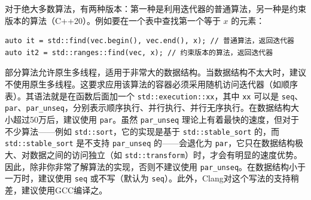 对于绝大多数算法，有两种版本：第一种是利用迭代器的普通算法，另一种是约束版本的算法（C++20）。例如要在一个表中查找第一个等于 $x$ 的元素：
\begin{verbatim}
auto it = std::find(vec.begin(), vec.end(), x); // 普通算法，返回迭代器
auto it2 = std::ranges::find(vec, x); // 约束版本的算法，返回迭代器
\end{verbatim}

部分算法允许原生多线程，适用于非常大的数据结构。当数据结构不太大时，建议不使用原生多线程。这要求应用该算法的容器必须采用随机访问迭代器（如顺序表）。其语法就是在函数后面加一个 \verb|std::execution::xx|，其中 \verb|xx| 可以是 \verb|seq|、\verb|par|、\verb|par_unseq|，分别表示顺序执行、并行执行、并行无序执行。在数据结构大小超过50万后，建议使用 \verb|par|。虽然 \verb|par_unseq| 理论上有着最快的速度，但对于不少算法——例如 \verb|std::sort|，它的实现是基于 \verb|std::stable_sort| 的，而 \verb|std::stable_sort| 是不支持 \verb|par_unseq| 的——会退化为 \verb|par|，它只在数据结构极大、对数据之间的访问独立（如 \verb|std::transform|）时，才会有明显的速度优势。因此，除非你非常了解算法的实现，否则不建议使用 \verb|par_unseq|。在数据结构小于一万时，建议使用 \verb|seq| 或不写（默认为 \verb|seq|）。此外，Clang对这个写法的支持稍差，建议使用GCC编译之。




